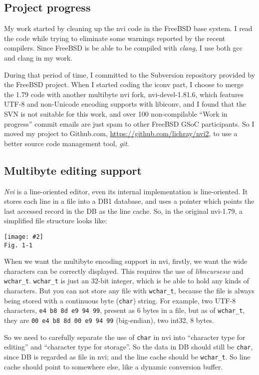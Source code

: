 \documentclass[11pt,twoside,a4paper]{article}
\newcommand{\fig}[3]{
	\begin{center}
	\texttt{[image: \#2]}\\
	\texttt{\small{Fig. #1}}
	\end{center}}
\begin{document}
\begin{mla}
\section{Project progress}

My work started by cleaning up the nvi code in the FreeBSD base
system. I read the code while trying to eliminate some warnings reported by
the recent compilers. Since FreeBSD is be able to be compiled with
\emph{clang},\cite{2} I use both gcc and clang in my work.

During that period of time, I committed to the Subversion repository provided
by the FreeBSD project. When I started coding the iconv part, I choose to merge
the 1.79 code with another multibyte nvi fork, nvi-devel-1.81.6, which
features UTF-8 and non-Unicode encoding supports with libiconv, and I found
that the SVN is not suitable for this work, and over 100 non-compilable ``Work in
progress'' commit emails are just spam to other FreeBSD GSoC participants. So
I moved my project to Github.com, \url{https://github.com/lichray/nvi2}, to
use a better source code management tool, \emph{git}.

\subsection{Multibyte editing support}

\emph{Nvi} is a line-oriented editor, even its internal implementation is
line-oriented. It stores each line in a file into a DB1 database, and uses a
pointer which points the last accessed record in the DB as the line cache.
So, in the original nvi-1.79, a simplified file structure looks like:

\fig{1-1}{exf_1}{0.5}

When we want the multibyte encoding support in nvi, firstly, we want the wide
characters can be correctly displayed. This requires the use of
\emph{libncursesw} and \verb|wchar_t|. \verb|wchar_t| is just an 32-bit
integer, which is be able to hold any kinds of characters. But you can not
store any file with \verb|wchar_t|, because the file is always being stored
with a continuous byte (\verb|char|) string. For example, two UTF-8
characters, \verb|e4 b8 8d e9 94 99|, present as 6 bytes in a file, but as of
\verb|wchar_t|, they are \verb|00 e4 b8 8d 00 e9 94 99| (big-endian), two
int32, 8 bytes.

So we need to carefully separate the use of \verb|char| in nvi into
``character type for editing'' and ``character type for storage''. So the
data in DB should still be \verb|char|, since DB is regarded as file in
nvi; and the line cache should be \verb|wchar_t|. So line cache should point
to somewhere else, like a dynamic conversion buffer.


\end{mla}
\end{document}

